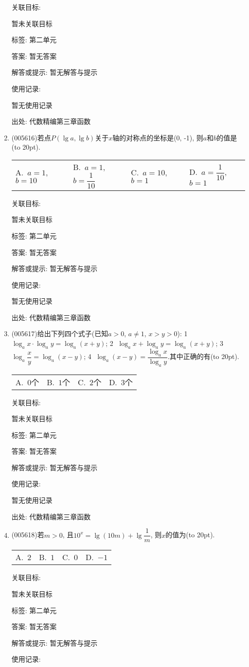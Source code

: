 \documentclass[10pt,a4paper]{article}
\newcommand{\bracket}[1]{(\hbox to #1pt{})}
\newcommand{\fourch}[4]{\par\begin{tabular}{p{.23\textwidth}p{.23\textwidth}p{.23\textwidth}p{.23\textwidth}}
A.~#1 &B.~#2& C.~#3& D.~#4
\end{tabular}}
\begin{document}
\begin{enumerate}[1.]
关联目标:

暂未关联目标



标签: 第二单元

答案: 暂无答案

解答或提示: 暂无解答与提示

使用记录:

暂无使用记录


出处: 代数精编第三章函数
\item { (005616)}若点$P(\lg a,\lg b)$关于$x$轴的对称点的坐标是(0, -1), 则$a$和$b$的值是\bracket{20}.
\fourch{$a=1$, $b=10$}{$a=1$, $b=\dfrac 1{10}$}{$a=10$, $b=1$}{$a=\dfrac 1{10}$, $b=1$}


关联目标:

暂未关联目标



标签: 第二单元

答案: 暂无答案

解答或提示: 暂无解答与提示

使用记录:

暂无使用记录


出处: 代数精编第三章函数
\item { (005617)}给出下列四个式子(已知$a>0$, $a\ne 1$, $x>y>0$): \textcircled{1} $\log_ax\cdot \log_ay=\log_a(x+y)$; \textcircled{2} $\log_ax+\log_ay=\log_a(x+y)$; \textcircled{3} $\log_a\dfrac xy=\log_a(x-y)$; \textcircled{4} $\log_a(x-y)=\dfrac{\log_ax}{\log_ay}$.其中正确的有\bracket{20}.
\fourch{$0$个}{$1$个}{$2$个}{$3$个}


关联目标:

暂未关联目标



标签: 第二单元

答案: 暂无答案

解答或提示: 暂无解答与提示

使用记录:

暂无使用记录


出处: 代数精编第三章函数
\item { (005618)}若$m>0$, 且$10^x=\lg (10m)+\lg \dfrac 1m$, 则$x$的值为\bracket{20}.
\fourch{$2$}{$1$}{$0$}{$-1$}


关联目标:

暂未关联目标



标签: 第二单元

答案: 暂无答案

解答或提示: 暂无解答与提示

使用记录:


\end{enumerate}
\end{document}
